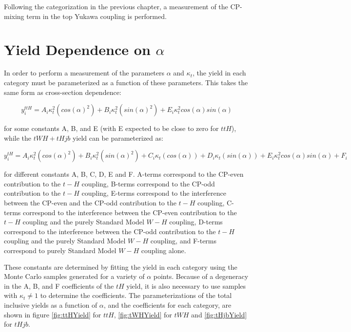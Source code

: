 Following the categorization in the previous chapter, a measurement of the CP-mixing term in the top Yukawa coupling is performed. 

\section{Yield Dependence on $\alpha$} \label{sec:YieldPar}

In order to perform a measurement of the parameters $\alpha$ and $\kappa_{t}$, the yield in each category must be parameterized as a function of these parameters. This takes the same form as cross-section dependence:

\begin{equation}
y_{i}^{ttH} =  A_{i}\kappa_{t}^{2} (cos(\alpha)^{2}) + B_{i}\kappa_{t}^{2} (sin(\alpha)^{2}) + E_{i} \kappa_{t}^{2} cos(\alpha)sin(\alpha)
\end{equation}

for some constants A, B, and E (with E expected to be close to zero for $ttH$), while the $tWH+tHjb$ yield can be parameterized as:

\begin{equation}
y_{i}^{tH} =  A_{i}\kappa_{t}^{2} (cos(\alpha)^{2}) + B_{i}\kappa_{t}^{2} (sin(\alpha)^{2}) + C_{i}\kappa_{t} (cos(\alpha))+ D_{i}\kappa_{t} (sin(\alpha)) + E_{i} \kappa_{t}^{2} cos(\alpha)sin(\alpha) + F_{i}
\end{equation}

for different constants A, B, C, D, E and F. A-terms correspond to the CP-even contribution to the $t-H$ coupling, B-terms correspond to the CP-odd contribution to the $t-H$ coupling, E-terms correspond to the interference between the CP-even and the CP-odd contribution to the $t-H$ coupling, C-terms correspond to the interference between the CP-even contribution to the $t-H$ coupling and the purely Standard Model $W-H$ coupling, D-terms correspond to the interference between the CP-odd contribution to the $t-H$ coupling and the purely Standard Model $W-H$ coupling, and F-terms correspond to purely Standard Model $W-H$ coupling alone.

These constants are determined by fitting the yield in each category using the Monte Carlo samples generated for a variety of $\alpha$ points. Because of a degeneracy in the A, B, and F coefficients of the $tH$ yield, it is also necessary to use samples with $\kappa_{t} \neq 1$ to determine the coefficients. The parameterizations of the total inclusive yields as a function of $\alpha$, and the coefficients for each category, are shown in figure \ref{fig:ttHYield} for $ttH$, \ref{fig:tWHYield} for $tWH$ and \ref{fig:tHjbYield} for $tHjb$.

